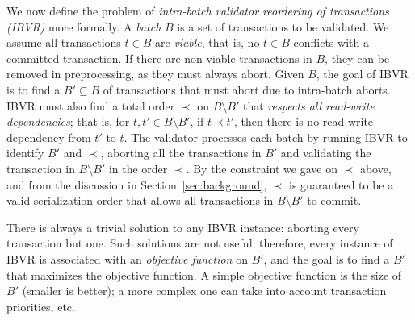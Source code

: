 We now define the problem of {\em intra-batch validator reordering of transactions (IBVR)} more formally. A \emph{batch} $B$ is a set of transactions to be validated. We assume all transactions $t \in B$ are \emph{viable}, that is, no $t \in B$ conflicts with a committed transaction. If there are non-viable transactions in $B$, they can be removed in preprocessing, as they must always abort.
Given $B$, the goal of IBVR is to find a $B' \subseteq B$ of transactions that must abort due to intra-batch aborts. IBVR must also find a 
total order $\prec$ on $B \setminus B'$ that \emph{respects all read-write dependencies}; that is, for $t,t'\in B \setminus B'$, if $t \prec t'$, then there is no read-write dependency from $t'$ to $t$.
The validator processes each batch by running IBVR to identify $B'$ and $\prec$, aborting all the transactions in $B'$  and validating the transaction in $B \setminus B'$  in the order $\prec$. By the constraint we gave on $\prec$ above, and from the discussion in Section~\ref{sec:background}, $\prec$ is guaranteed to be a valid serialization order that allows all transactions in $B \setminus B'$  to commit.



There is always a trivial solution to any IBVR instance: aborting every
transaction but one. Such solutions are not useful; therefore, every instance of
IBVR is associated with an \emph{objective function} on $B'$, and the goal is to
find a $B'$ that maximizes the objective function. A simple objective function
is the size of $B'$ (smaller is better); a more complex one can take into
account transaction priorities, etc.






